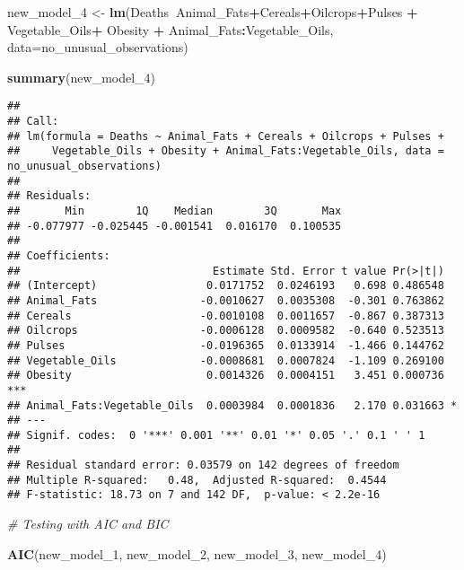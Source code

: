 \documentclass[
]{article}
\newenvironment{Shaded}{\begin{snugshade}}{\end{snugshade}}
\newcommand{\CommentTok}[1]{\textcolor[rgb]{0.56,0.35,0.01}{\textit{#1}}}
\newcommand{\DataTypeTok}[1]{\textcolor[rgb]{0.13,0.29,0.53}{#1}}
\newcommand{\DecValTok}[1]{\textcolor[rgb]{0.00,0.00,0.81}{#1}}
\newcommand{\KeywordTok}[1]{\textcolor[rgb]{0.13,0.29,0.53}{\textbf{#1}}}
\newcommand{\NormalTok}[1]{#1}
\newcommand{\OperatorTok}[1]{\textcolor[rgb]{0.81,0.36,0.00}{\textbf{#1}}}
\newcommand{\StringTok}[1]{\textcolor[rgb]{0.31,0.60,0.02}{#1}}
\begin{document}
\begin{Shaded}
\begin{Highlighting}[]
\NormalTok{new_model_}\DecValTok{4}\NormalTok{ <-}\StringTok{ }\KeywordTok{lm}\NormalTok{(Deaths}\OperatorTok{~}\NormalTok{Animal_Fats}\OperatorTok{+}\NormalTok{Cereals}\OperatorTok{+}\NormalTok{Oilcrops}\OperatorTok{+}\NormalTok{Pulses }\OperatorTok{+}\StringTok{ }\NormalTok{Vegetable_Oils}\OperatorTok{+}
\StringTok{                    }\NormalTok{Obesity }\OperatorTok{+}\StringTok{ }\NormalTok{Animal_Fats}\OperatorTok{:}\NormalTok{Vegetable_Oils, }\DataTypeTok{data=}\NormalTok{no_unusual_observations)}

\KeywordTok{summary}\NormalTok{(new_model_}\DecValTok{4}\NormalTok{)}
\end{Highlighting}
\end{Shaded}

\begin{verbatim}
## 
## Call:
## lm(formula = Deaths ~ Animal_Fats + Cereals + Oilcrops + Pulses + 
##     Vegetable_Oils + Obesity + Animal_Fats:Vegetable_Oils, data = no_unusual_observations)
## 
## Residuals:
##       Min        1Q    Median        3Q       Max 
## -0.077977 -0.025445 -0.001541  0.016170  0.100535 
## 
## Coefficients:
##                              Estimate Std. Error t value Pr(>|t|)    
## (Intercept)                 0.0171752  0.0246193   0.698 0.486548    
## Animal_Fats                -0.0010627  0.0035308  -0.301 0.763862    
## Cereals                    -0.0010108  0.0011657  -0.867 0.387313    
## Oilcrops                   -0.0006128  0.0009582  -0.640 0.523513    
## Pulses                     -0.0196365  0.0133914  -1.466 0.144762    
## Vegetable_Oils             -0.0008681  0.0007824  -1.109 0.269100    
## Obesity                     0.0014326  0.0004151   3.451 0.000736 ***
## Animal_Fats:Vegetable_Oils  0.0003984  0.0001836   2.170 0.031663 *  
## ---
## Signif. codes:  0 '***' 0.001 '**' 0.01 '*' 0.05 '.' 0.1 ' ' 1
## 
## Residual standard error: 0.03579 on 142 degrees of freedom
## Multiple R-squared:   0.48,  Adjusted R-squared:  0.4544 
## F-statistic: 18.73 on 7 and 142 DF,  p-value: < 2.2e-16
\end{verbatim}

\begin{Shaded}
\begin{Highlighting}[]
\CommentTok{# Testing with AIC and BIC }

\KeywordTok{AIC}\NormalTok{(new_model_}\DecValTok{1}\NormalTok{, new_model_}\DecValTok{2}\NormalTok{, new_model_}\DecValTok{3}\NormalTok{, new_model_}\DecValTok{4}\NormalTok{)}
\end{Highlighting}
\end{Shaded}
\end{document}
